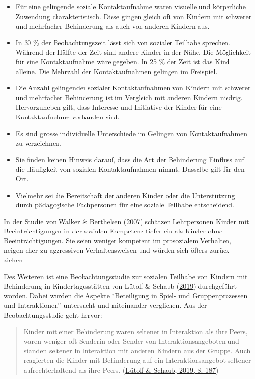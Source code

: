 \documentclass[
  ngerman,
  11pt,
  paper=a4,
  twoside,
  titlepage=true,
  openright,
  abstract=on,
  toc=listofnumbered,
  numbers=noenddot,
  chapterprefix=true,
  headings=optiontohead,
  svgnames,
  dvipsnames]{scrreprt}
\providecommand{\tightlist}{%
  \setlength{\itemsep}{0pt}\setlength{\parskip}{0pt}}
\begin{document}
\begin{itemize}
\tightlist
\item
  Für eine gelingende soziale Kontaktaufnahme waren visuelle und
  körperliche Zuwendung charakteristisch. Diese gingen gleich oft von
  Kindern mit schwerer und mehrfacher Behinderung als auch von anderen
  Kindern aus.
\item
  In 30 \% der Beobachtungszeit lässt sich von sozialer Teilhabe
  sprechen. Während der Hälfte der Zeit sind andere Kinder in der Nähe.
  Die Möglichkeit für eine Kontaktaufnahme wäre gegeben. In 25 \% der
  Zeit ist das Kind alleine. Die Mehrzahl der Kontaktaufnahmen gelingen
  im Freispiel.
\item
  Die Anzahl gelingender sozialer Kontaktaufnahmen von Kindern mit
  schwerer und mehrfacher Behinderung ist im Vergleich mit anderen
  Kindern niedrig. Hervorzuheben gilt, dass Interesse und Initiative der
  Kinder für eine Kontaktaufnahme vorhanden sind.
\item
  Es sind grosse individuelle Unterschiede im Gelingen von
  Kontaktaufnahmen zu verzeichnen.
\item
  Sie finden keinen Hinweis darauf, dass die Art der Behinderung
  Einfluss auf die Häufigkeit von sozialen Kontaktaufnahmen nimmt.
  Dasselbe gilt für den Ort.
\item
  Vielmehr sei die Bereitschaft der anderen Kinder oder die
  Unterstützung durch pädagogische Fachpersonen für eine soziale
  Teilhabe entscheidend.
\end{itemize}

In der Studie von Walker \& Berthelsen
(\protect\hyperlink{ref-walker}{2007}) schätzen Lehrpersonen Kinder mit
Beeinträchtigungen in der sozialen Kompetenz tiefer ein als Kinder ohne
Beeinträchtigungen. Sie seien weniger kompetent im prosozialem
Verhalten, neigen eher zu aggressiven Verhaltensweisen und würden sich
öfters zurück ziehen.

Des Weiteren ist eine Beobachtungsstudie zur sozialen Teilhabe von
Kindern mit Behinderung in Kindertagesstätten von Lütolf \& Schaub
(\protect\hyperlink{ref-beobachtungsstudie}{2019}) durchgeführt worden.
Dabei wurden die Aspekte “Beteiligung in Spiel- und Gruppenprozessen und
Interaktionen” untersucht und miteinander verglichen. Aus der
Beobachtungsstudie geht hervor:

\begin{quote}
Kinder mit einer Behinderung waren seltener in Interaktion als ihre
Peers, waren weniger oft Senderin oder Sender von Interaktionsangeboten
und standen seltener in Interaktion mit anderen Kindern aus der Gruppe.
Auch reagierten die Kinder mit Behinderung auf ein Interaktionsangebot
seltener aufrechterhaltend als ihre Peers.
(\protect\hyperlink{ref-beobachtungsstudie}{Lütolf \& Schaub, 2019, S.
187})
\end{quote}
\end{document}
